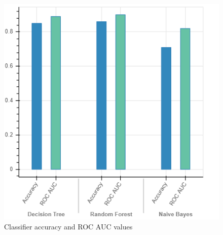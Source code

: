 \documentclass[10pt, conference, compsocconf]{IEEEtran}
\begin{document}
\begin{figure}
  \includegraphics[scale=0.45]{acc_roc}
  \centering
  \caption{Classifier accuracy and ROC AUC values}
  \label{fig:acc_roc}
\end{figure}
%
%

\end{document}
